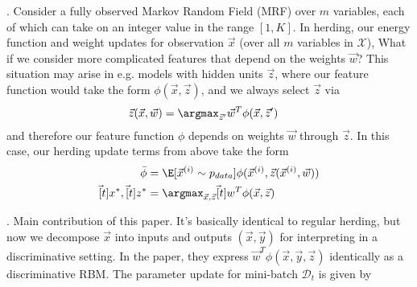 \documentclass[11pt]{article}
\begin{document}
\myspace
\p {}. Consider a fully observed Markov Random Field (MRF) over $m$ variables, each of which can take on an integer value in the range $[1, K]$. In herding, our energy function and weight updates for observation $\vec x$ (over all $m$ variables in $\mathcal X$),
What if we consider more complicated features that depend on the weights $\vec w$? This situation may arise in e.g. models with hidden units $\vec z$, where our feature function would take the form $\phi(\vec x, \vec z)$, and we always select $\vec z$ via
\begin{align}
\vec{z}(\vec x, \vec w)
&= \argmax_{\vec{z}'} \vec{w}^T \phi(\vec x, \vec{z}')
\end{align}
and therefore our feature function $\phi$ depends on weights $\vec w$ through $\vec z$. In this case, our herding update terms from above take the form
\begin{align}
\bar{\phi}
&= \E[\vec{x}^{(i)} \sim p_{data}]{\phi(\vec{x}^{(i)}, \vec{z}(\vec{x}^{(i)}, \vec{w})  )} \\
\vec[t]{x}^*, \vec[t]{z}^*
&= \argmax_{\vec x, \vec z} \vec[t]{w}^T \phi(\vec x, \vec z)
\end{align}

\myspace
\p {}. Main contribution of this paper. It's basically identical to regular herding, but now we decompose $\vec x$ into inputs and outputs $(\vec x, \vec y)$ for interpreting in a discriminative setting. In the paper, they express $\vec{w}^T \phi(\vec x, \vec y, \vec z)$ identically as a discriminative RBM. The parameter update for mini-batch $\mathcal{D}_t$ is given by 
\end{document}
